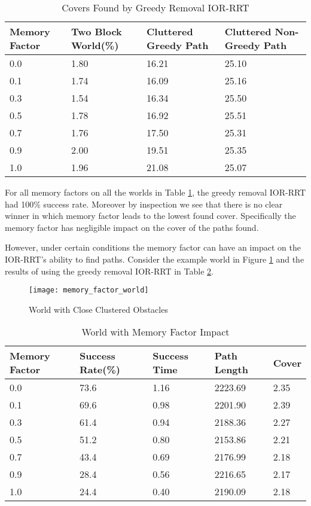 \begin{table}[h!]
\begin{tabular}{@{}llll@{}}
\toprule
Memory Factor & Two Block World(\%)  & Cluttered Greedy Path  & Cluttered Non-Greedy Path \\ 
\midrule
0.0 & 1.80 & 16.21 & 25.10 \\
0.1 & 1.74 & 16.09 & 25.16 \\
0.3 & 1.54 & 16.34 & 25.50 \\
0.5 & 1.78 & 16.92 & 25.51 \\
0.7 & 1.76 & 17.50 & 25.31 \\
0.9 & 2.00 & 19.51 & 25.35 \\ 
1.0 & 1.96 & 21.08 & 25.07 \\
\bottomrule
\end{tabular}
\caption{Covers Found by Greedy Removal IOR-RRT}
\label{tab:memory_factor_no_impact}
\end{table}

For all memory factors on all the worlds in Table \ref{tab:memory_factor_no_impact}, the greedy removal IOR-RRT had 100\% success rate. Moreover by inspection we see that there is no clear winner in which memory factor leads to the lowest found cover. Specifically the memory factor has negligible impact on the cover of the paths found. 

However, under certain conditions the memory factor can have an impact on the IOR-RRT's ability to find paths. Consider the example world in Figure \ref{fig:memory_factor_world} and the results of using the greedy removal IOR-RRT in Table \ref{tab:memory_factor_impact}.


\begin{figure}[h!]
    \centering
    \texttt{[image: memory\_factor\_world]}
    \caption{World with Close Clustered Obstacles}
    \label{fig:memory_factor_world}
\end{figure}

\begin{table}[h!]
\begin{tabular}{@{}lllll@{}}
\toprule
Memory Factor & Success Rate(\%)  & Success Time & Path Length & Cover \\ 
\midrule
0.0 & 73.6 & 1.16 & 2223.69 & 2.35 \\
0.1 & 69.6 & 0.98 & 2201.90 & 2.39 \\
0.3 & 61.4 & 0.94 & 2188.36 & 2.27 \\
0.5 & 51.2 & 0.80 & 2153.86 & 2.21 \\
0.7 & 43.4 & 0.69 & 2176.99 & 2.18 \\
0.9 & 28.4 & 0.56 & 2216.65 & 2.17 \\ 
1.0 & 24.4 & 0.40 & 2190.09 & 2.18 \\
\bottomrule
\end{tabular}
\caption{World with Memory Factor Impact}
\label{tab:memory_factor_impact}
\end{table}

